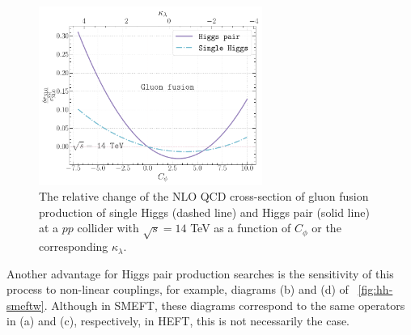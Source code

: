 \begin{figure}[h!]
	\begin{center}
		\includegraphics[width=0.65\textwidth]{figures/trilinear_single_vs_double}
		\caption{ The relative change of the NLO QCD cross-section of gluon fusion production of single Higgs (dashed line) and Higgs pair (solid line) at a $pp$ collider with $\sqrt{s}=14$ TeV as a function of $C_\phi$ or the corresponding $\kappa_\lambda$. \label{fig:hh-vs-h} }
	\end{center}
\end{figure}
Another advantage for Higgs pair production searches is the sensitivity of this process to non-linear couplings, for example, diagrams (b) and (d) of ~\autoref{fig:hh-smeftw}. Although in SMEFT, these diagrams correspond to the same operators in (a) and (c), respectively, in HEFT, this is not necessarily the case.
